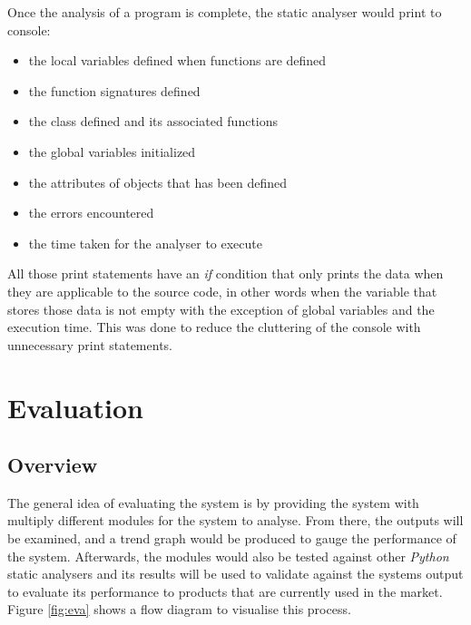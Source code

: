 \documentclass{l4proj}
\begin{document}
Once the analysis of a program is complete, the static analyser would print to console:

\begin{itemize}
    \item the local variables defined when functions are defined 
    \item the function signatures defined
    \item the class defined and its associated functions
    \item the global variables initialized
    \item the attributes of objects that has been defined
    \item the errors encountered
    \item the time taken for the analyser to execute
\end{itemize}

All those print statements have an \textit{if} condition that only prints the data when they are applicable to the source code, in other words when the variable that stores those data is not empty with the exception of global variables and the execution time. This was done to reduce the cluttering of the console with unnecessary print statements.



\chapter{Evaluation} 
\section{Overview}
The general idea of evaluating the system is by providing the system with multiply different modules for the system to analyse. From there, the outputs will be examined, and a trend graph would be produced to gauge the performance of the system. Afterwards, the modules would also be tested against other \emph{Python} static analysers and its results will be used to validate against the systems output to evaluate its performance to products that are currently used in the market. Figure \ref{fig:eva} shows a flow diagram to visualise this process.
\end{document}

